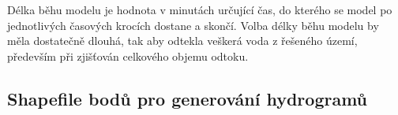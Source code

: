 
Délka běhu modelu je hodnota v minutách určující čas, do kterého se model po jednotlivých časových krocích dostane a skončí. Volba délky běhu modelu by měla dostatečně dlouhá, tak aby odtekla veškerá voda z řešeného území, především při zjišťován celkového objemu odtoku.
 




\subsection{Shapefile bodů pro generování hydrogramů} \label{sec:vstupbody}

